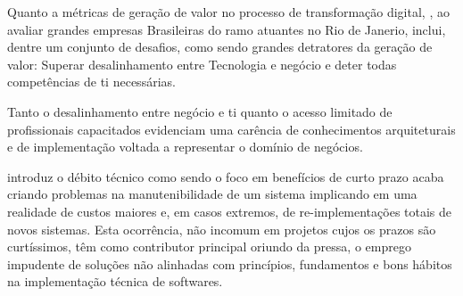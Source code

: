     Quanto a métricas de geração de valor no processo de transformação digital,
    , ao avaliar grandes empresas Brasileiras
    do ramo atuantes no Rio de Janerio, inclui, dentre um conjunto de desafios, como
    sendo grandes detratores da geração de valor: Superar desalinhamento entre Tecnologia e negócio
    e deter todas competências de \ac{ti} necessárias.

    Tanto o desalinhamento entre negócio e \ac{ti} quanto o acesso limitado de profissionais capacitados
    evidenciam uma carência de conhecimentos arquiteturais e de implementação voltada a
    representar o domínio de negócios.

     introduz o débito técnico como
    sendo o foco em benefícios de curto prazo acaba criando problemas na manutenibilidade
    de um sistema implicando em uma realidade de custos maiores e, em casos extremos,
    de re-implementações totais de novos sistemas. Esta ocorrência, não incomum em
    projetos cujos os prazos são curtíssimos, têm como contributor principal
    oriundo da pressa, o emprego impudente de soluções não alinhadas com princípios, 
    fundamentos e bons hábitos na implementação técnica de softwares.

    
    
    
    
    

\newpage
